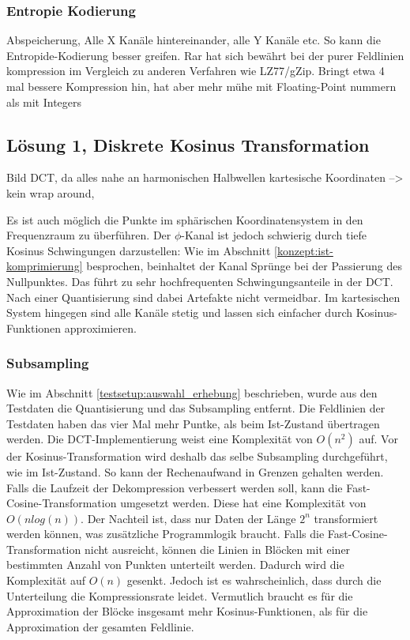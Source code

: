 \subsubsection{Entropie Kodierung} \label{konzept:loesung0:kodierung}
Abspeicherung, Alle X Kanäle hintereinander, alle Y Kanäle etc. So kann die Entropide-Kodierung besser greifen.
Rar hat sich bewährt bei der purer Feldlinien kompression im Vergleich zu anderen Verfahren wie LZ77/gZip. Bringt etwa 4 mal bessere Kompression hin, hat aber mehr mühe mit Floating-Point nummern als mit Integers

\subsection{Lösung 1, Diskrete Kosinus Transformation}
Bild
DCT, da alles nahe an harmonischen Halbwellen
kartesische Koordinaten --> kein wrap around,

Es ist auch möglich die Punkte im sphärischen Koordinatensystem in den Frequenzraum zu überführen. Der $\phi$-Kanal ist jedoch schwierig durch tiefe Kosinus Schwingungen darzustellen: Wie im Abschnitt \ref{konzept:ist-komprimierung} besprochen, beinhaltet der Kanal Sprünge bei der Passierung des Nullpunktes. Das führt zu sehr hochfrequenten Schwingungsanteile in der DCT. Nach einer Quantisierung sind dabei Artefakte nicht vermeidbar. Im kartesischen System hingegen sind alle Kanäle stetig und lassen sich einfacher durch Kosinus-Funktionen approximieren.\\

\subsubsection{Subsampling} \label{konzept:loesung1:subsampling}
Wie im Abschnitt \ref{testsetup:auswahl_erhebung} beschrieben, wurde aus den Testdaten die Quantisierung und das Subsampling entfernt. Die Feldlinien der Testdaten haben das vier Mal mehr Puntke, als beim Ist-Zustand übertragen werden. Die DCT-Implementierung weist eine Komplexität von $O(n^2)$ auf. Vor der Kosinus-Transformation wird deshalb das selbe Subsampling durchgeführt, wie im Ist-Zustand. So kann der Rechenaufwand in Grenzen gehalten werden.\\
Falls die Laufzeit der Dekompression verbessert werden soll, kann die Fast-Cosine-Transformation umgesetzt werden. Diese hat eine Komplexität von $O(n log(n))$. Der Nachteil ist, dass nur Daten der Länge $2^n$ transformiert werden können, was zusätzliche Programmlogik braucht. Falls die Fast-Cosine-Transformation nicht ausreicht, können die Linien in Blöcken mit einer bestimmten Anzahl von Punkten unterteilt werden. Dadurch wird die Komplexität auf $O(n)$ gesenkt. Jedoch ist es wahrscheinlich, dass durch die Unterteilung die Kompressionsrate leidet. Vermutlich braucht es für die Approximation der Blöcke insgesamt mehr Kosinus-Funktionen, als für die Approximation der gesamten Feldlinie.\\

